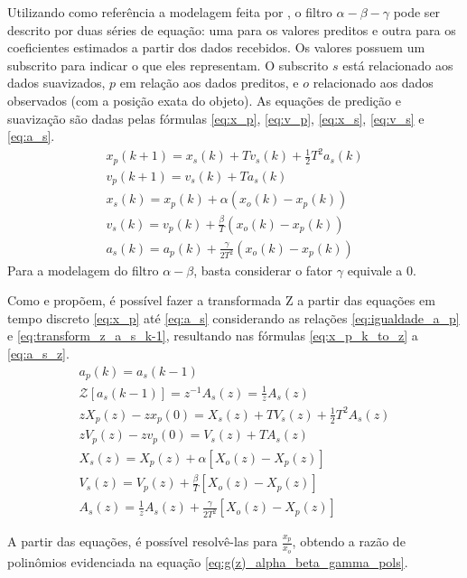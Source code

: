 Utilizando como referência a modelagem feita por \cite{tenne2000}, o filtro $\alpha-\beta-\gamma$ pode ser descrito por duas séries de equação: uma para os valores preditos e outra para os coeficientes estimados a partir dos dados recebidos. Os valores possuem um subscrito para indicar o que eles representam. O subscrito $s$ está relacionado aos dados suavizados, $p$ em relação aos dados preditos, e $o$ relacionado aos dados observados (com a posição exata do objeto). As equações de predição e suavização são dadas pelas fórmulas \eqref{eq:x_p}, \eqref{eq:v_p}, \eqref{eq:x_s}, \eqref{eq:v_s} e \eqref{eq:a_s}.
\begin{align}
x_p(k+1)=x_s(k)+Tv_s(k)+\frac{1}{2}T^2a_s(k)\label{eq:x_p} \\
v_p(k+1) = v_s(k)+Ta_s(k)\label{eq:v_p} \\
x_s(k) = x_p(k)+\alpha(x_o(k)-x_p(k))\label{eq:x_s} \\
v_s(k) = v_p(k)+\frac{\beta}{T}(x_o(k)-x_p(k))\label{eq:v_s} \\
a_s(k) = a_p(k)+\frac{\gamma}{2T^2}(x_o(k)-x_p(k))\label{eq:a_s}
\end{align}
Para a modelagem do filtro $\alpha-\beta$, basta considerar o fator $\gamma$ equivale a 0.


Como \cite{tenne2000} e \cite{sighencea2022} propõem, é possível fazer a transformada Z a partir das equações em tempo discreto \eqref{eq:x_p} até \eqref{eq:a_s} considerando as relações \eqref{eq:igualdade_a_p} e \eqref{eq:transform_z_a_s_k-1}, resultando nas fórmulas \eqref{eq:x_p_k_to_z} a \eqref{eq:a_s_z}.
\begin{align}
a_p(k) = a_s(k-1) \label{eq:igualdade_a_p} \\
\mathcal{Z}[a_s(k-1)] = z^{-1}A_s(z) = \frac{1}{z}A_s(z) \label{eq:transform_z_a_s_k-1} \\
zX_p(z) - zx_p(0) =X_s(z)+TV_s(z)+\frac{1}{2}T^2A_s(z)\label{eq:x_p_k_to_z} \\
zV_p(z) - zv_p(0) = V_s(z)+TA_s(z)\label{eq:v_p_k_to_z} \\
X_s(z) = X_p(z)+\alpha[X_o(z)-X_p(z)]\label{eq:x_s_z} \\
V_s(z) = V_p(z)+\frac{\beta}{T}[X_o(z)-X_p(z)]\label{eq:v_s_z} \\
A_s(z) = \frac{1}{z}A_s(z)+\frac{\gamma}{2T^2}[X_o(z)-X_p(z)]\label{eq:a_s_z}
\end{align}

A partir das equações, é possível resolvê-las para $\frac{x_p}{x_o}$, obtendo a razão de polinômios evidenciada na equação \eqref{eq:g(z)_alpha_beta_gamma_pols}.

